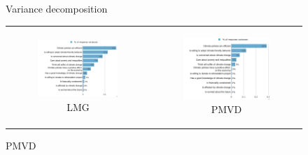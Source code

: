 \documentclass{article}
\begin{document}
\begin{figure}[h!]
\begin{center}
	\caption{Variance decomposition}
	\caption*{Index All Policies}
	\setlength\extrarowheight{-1pt}
	\begin{tabular}{cc}
		\begin{subfigure}{0.5\textwidth}
		\caption{LMG}
			\includegraphics[width=\textwidth]{lmg_all_policies_non_standardized}
		\end{subfigure}&
		\begin{subfigure}{0.5\textwidth}
		\caption{PMVD}
			\includegraphics[width=\textwidth]{pmvd_all_policies_non_standardized}
		\end{subfigure}\\
	\end{tabular}


\end{center}
\end{figure}
\end{document}
